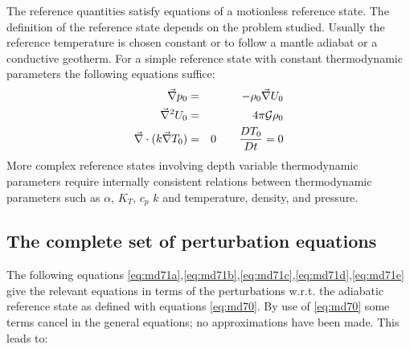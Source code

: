 
\vspace{0.5cm}

The reference quantities satisfy equations of a motionless reference state. The definition
of the reference state depends on the problem studied. Usually the reference temperature
is chosen constant or to follow a mantle adiabat or a conductive geotherm. For a simple
reference state with constant thermodynamic parameters the following equations suffice:
\begin{eqnarray}
\vec\nabla p_0 &=& -\rho_0 \vec\nabla U_0 \\
\vec\nabla^2 U_0 &=& 4\pi {\cal G} \rho_0 \\
\vec\nabla \cdot ( k \vec\nabla T_0) &=& 0 \qquad \frac{DT_0}{Dt}=0
\label{eq:md70}
\end{eqnarray}
More complex reference states involving depth variable thermodynamic parameters
require internally consistent relations between thermodynamic parameters such as
$\alpha$, $K_T$, $c_p$ $k$ and temperature, density, and pressure.

\vspace{0.5cm}




\subsection{The complete set of perturbation equations}

The following equations \eqref{eq:md71a},\eqref{eq:md71b},\eqref{eq:md71c},\eqref{eq:md71d},\eqref{eq:md71e} 
give the relevant equations in terms of the perturbations w.r.t. the
adiabatic reference state as defined with equations \eqref{eq:md70}. By use of \eqref{eq:md70} 
some terms cancel in the general equations; no approximations have been made. This leads to:


